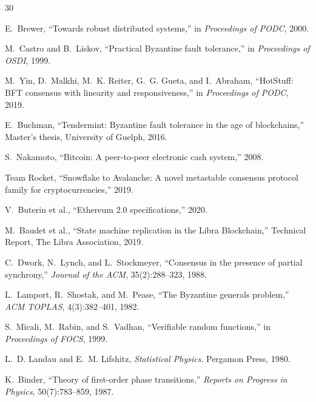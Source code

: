 

\begin{thebibliography}{30}

E.~Brewer, ``Towards robust distributed systems,'' in
\textit{Proceedings of PODC}, 2000.

M.~Castro and B.~Liskov, ``Practical Byzantine fault tolerance,'' in
\textit{Proceedings of OSDI}, 1999.

M.~Yin, D.~Malkhi, M.~K. Reiter, G.~G. Gueta, and I.~Abraham, ``HotStuff: BFT
consensus with linearity and responsiveness,'' in \textit{Proceedings of PODC}, 2019.

E.~Buchman, ``Tendermint: Byzantine fault tolerance in the age of blockchains,''
Master's thesis, University of Guelph, 2016.

S.~Nakamoto, ``Bitcoin: A peer-to-peer electronic cash system,'' 2008.

Team Rocket, ``Snowflake to Avalanche: A novel metastable consensus protocol family
for cryptocurrencies,'' 2019.

V.~Buterin et al., ``Ethereum 2.0 specifications,'' 2020.

M.~Baudet et al., ``State machine replication in the Libra Blockchain,''
Technical Report, The Libra Association, 2019.

C.~Dwork, N.~Lynch, and L.~Stockmeyer, ``Consensus in the presence of partial
synchrony,'' \textit{Journal of the ACM}, 35(2):288--323, 1988.

L.~Lamport, R.~Shostak, and M.~Pease, ``The Byzantine generals problem,''
\textit{ACM TOPLAS}, 4(3):382--401, 1982.

S.~Micali, M.~Rabin, and S.~Vadhan, ``Verifiable random functions,'' in
\textit{Proceedings of FOCS}, 1999.

L.~D. Landau and E.~M. Lifshitz, \textit{Statistical Physics}. Pergamon Press, 1980.

K.~Binder, ``Theory of first-order phase transitions,''
\textit{Reports on Progress in Physics}, 50(7):783--859, 1987.


\end{thebibliography}
